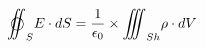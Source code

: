 \documentclass[preview]{standalone}
\begin{document}
\begin{align*}
\def\ooint{{\bigcirc}\kern-12.5pt{\int}\kern-6.5pt{\int}}\ooint_S{E\cdot dS} = {1\over{\epsilon_0}}\times{{\int}\kern-6.5pt{\int}\kern-6.5pt{\int} _{Sh} {\rho \cdot dV}}
\end{align*}
\end{document}
